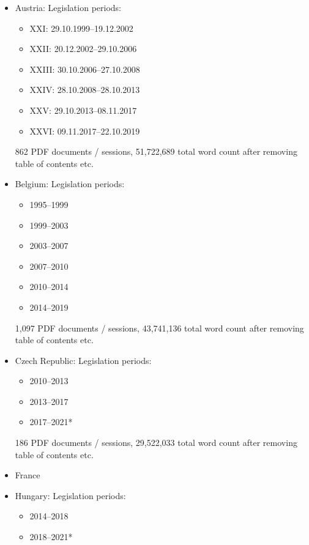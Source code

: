 \documentclass[
  12pt,
]{scrreprt}
\providecommand{\tightlist}{%
  \setlength{\itemsep}{0pt}\setlength{\parskip}{0pt}}
\begin{document}
\begin{itemize}
\item
  Austria: Legislation periods:

  \begin{itemize}
  \tightlist
  \item
    XXI: 29.10.1999--19.12.2002
  \item
    XXII: 20.12.2002--29.10.2006
  \item
    XXIII: 30.10.2006--27.10.2008
  \item
    XXIV: 28.10.2008--28.10.2013
  \item
    XXV: 29.10.2013--08.11.2017
  \item
    XXVI: 09.11.2017--22.10.2019
  \end{itemize}

  862 PDF documents / sessions, 51,722,689 total word count after
  removing table of contents etc.
\item
  Belgium: Legislation periods:

  \begin{itemize}
  \tightlist
  \item
    1995--1999
  \item
    1999--2003
  \item
    2003--2007
  \item
    2007--2010
  \item
    2010--2014
  \item
    2014--2019
  \end{itemize}

  1,097 PDF documents / sessions, 43,741,136 total word count after
  removing table of contents etc.
\item
  Czech Republic: Legislation periods:

  \begin{itemize}
  \tightlist
  \item
    2010--2013
  \item
    2013--2017
  \item
    2017--2021*
  \end{itemize}

  186 PDF documents / sessions, 29,522,033 total word count after
  removing table of contents etc.
\item
  France
\item
  Hungary: Legislation periods:

  \begin{itemize}
  \tightlist
  \item
    2014--2018
  \item
    2018--2021*
  \end{itemize}


\end{itemize}
\end{document}
